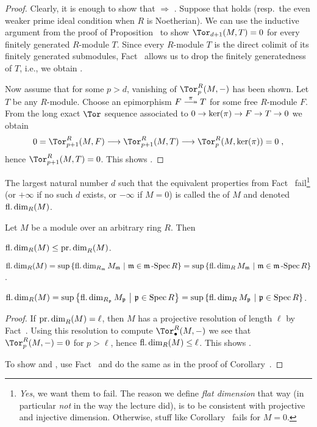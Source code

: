 \documentclass[a4paper,parskip=half,numbers=enddot, DIV=12]{scrreprt}
\begin{document}
\begin{proof}
	Clearly, it is enough to show that  $\Rightarrow$ . Suppose that  holds (resp.\ the even weaker prime ideal condition when $R$ is Noetherian). We can use the inductive argument from the proof of Proposition~ to show $\Tor_{d+1}(M,T)=0$ for every finitely generated $R$-module $T$. Since every $R$-module $T$ is the direct colimit of its finitely generated submodules, Fact~ allows us to drop the finitely generatedness of $T$, i.e., we obtain .
	
	Now assume that for some $p>d$, vanishing of $\Tor_p^R(M,-)$ has been shown. Let $T$ be any $R$-module. Choose an epimorphism $F\epimorphism[\pi]T$ for some free $R$-module $F$. From the long exact $\Tor$ sequence associated to $0\morphism \ker(\pi)\morphism F\morphism T\morphism 0$ we obtain
	\begin{align*}
		0=\Tor_{p+1}^R(M,F)\morphism\Tor_{p+1}^R(M,T)\morphism\Tor_p^R(M,\ker (\pi))=0\;,
	\end{align*}
	hence $\Tor_{p+1}^R(M,T)=0$. This shows .
\end{proof}
\begin{defi}
	The largest natural number $d$ such that the equivalent properties from Fact~ fail\footnote{\emph{Yes}, we want them to fail. The reason we define \emph{flat dimension} that way (in particular \emph{not} in the way the lecture did), is to be consistent with projective and injective dimension. Otherwise, stuff like Corollary~ fails for $M=0$.} (or $+\infty$ if no such $d$ exists, or $-\infty$ if $M=0$) is called the  of $M$ and denoted $\operatorname{fl.dim}_R(M)$.
\end{defi}
\begin{fact}
	Let $M$ be a module over an arbitrary ring $R$. Then
	\begin{alphanumerate}
		\item $\operatorname{fl.dim}_R(M)\leq \operatorname{pr.dim}_R(M)$.
		\item $\operatorname{fl.dim}_R(M)=\sup\left\{\operatorname{fl.dim}_{R_{\mathfrak{m}}}M_{\mathfrak{m}}\ \middle|\ \mathfrak{m}\in\mathfrak{m}\operatorname{-Spec} R\right\}=\sup\left\{\operatorname{fl.dim}_RM_{\mathfrak{m}}\ \middle|\  \mathfrak{m}\in\mathfrak{m}\operatorname{-Spec} R\right\}$.
		\item $\operatorname{fl.dim}_R(M)=\sup\left\{\operatorname{fl.dim}_{R_{\mathfrak{p}}}M_{\mathfrak{p}}\ \middle|\  \mathfrak{p}\in\operatorname{Spec} R\right\}=\sup\left\{\operatorname{fl.dim}_RM_{\mathfrak{p}}\ \middle|\  \mathfrak{p}\in\operatorname{Spec} R\right\}$.
	\end{alphanumerate}
\end{fact}
\begin{proof}
	If $\operatorname{pr.dim}_R(M)=\ell$, then $M$ has a projective resolution of length $\ell$ by Fact~. Using this resolution to compute $\Tor_\bullet^R(M,-)$ we see that $\Tor_p^R(M,-)=0$ for $p>\ell$, hence $\operatorname{fl.dim}_R(M)\leq \ell$. This shows .
	
	To show  and , use Fact~ and do the same as in the proof of Corollary~.
\end{proof}
\end{document}
